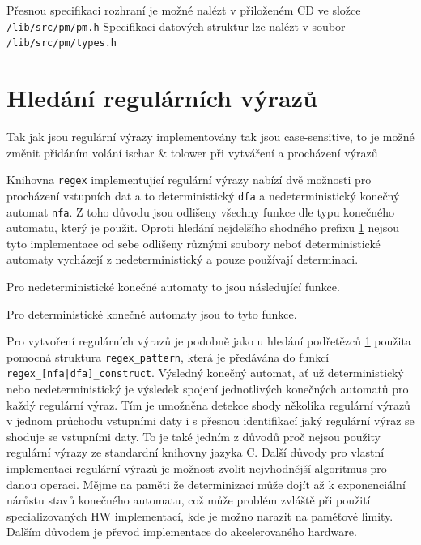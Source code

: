 Přesnou specifikaci rozhraní je možné nalézt v přiloženém CD ve složce \texttt{/lib/src/pm/pm.h}
Specifikaci datových struktur lze nalézt v soubor \texttt{/lib/src/pm/types.h}

\section{Hledání regulárních výrazů}  %
Tak jak jsou regulární výrazy implementovány tak jsou case-sensitive, to je možné změnit
přidáním volání ischar \& tolower při vytváření a procházení výrazů

Knihovna \texttt{regex} implementující regulární výrazy nabízí dvě možnosti pro procházení
vstupních dat a to deterministický \texttt{dfa} a nedeterministický konečný automat \texttt{nfa}.
Z toho důvodu jsou odlišeny všechny funkce dle typu konečného automatu, který je použit.
Oproti hledání nejdelšího shodného prefixu \ref{} nejsou tyto implementace od sebe odlišeny
různými soubory neboť deterministické automaty vycházejí z nedeterministický a pouze používají
determinaci.

Pro nedeterministické konečné automaty to jsou následující funkce.

Pro deterministické konečné automaty jsou to tyto funkce.

Pro vytvoření regulárních výrazů je podobně jako u hledání podřetězců \ref{}
použita pomocná struktura \texttt{regex\_pattern}, která je předávána do funkcí \texttt{regex\_[nfa|dfa]\_construct}.
Výsledný konečný automat, ať už deterministický nebo nedeterministický je výsledek spojení jednotlivých
konečných automatů pro každý regulární výraz. Tím je umožněna detekce shody několika
regulární výrazů v jednom průchodu vstupními daty i s přesnou identifikací jaký regulární
výraz se shoduje se vstupními daty. To je také jedním z důvodů proč nejsou použity regulární výrazy ze standardní
knihovny jazyka C.
Další důvody pro vlastní implementaci regulární výrazů je možnost zvolit nejvhodnější algoritmus pro danou operaci.
Mějme na paměti že determinizací může dojít až k exponenciální nárůstu stavů konečného automatu, což může problém
zvláště při použití specializovaných HW implementací, kde je možno narazit na paměťové limity.
Dalším důvodem je převod implementace do akcelerovaného hardware.


